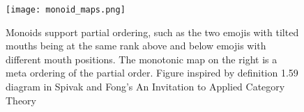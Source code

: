 \begin{figure}[tb]
    \centering %
    \texttt{[image: monoid\_maps.png]}
    \caption{Monoids support partial ordering, such as the two emojis with tilted mouths being at the same rank above and below emojis with different mouth positions. The monotonic map on the right is a meta ordering of the partial order.  Figure inspired by definition 1.59 diagram in Spivak and Fong's An Invitation to Applied Category Theory \cite{fongInvitationAppliedCategory2019}}
    \label{fig:data_partial_order}
  \end{figure}
  
